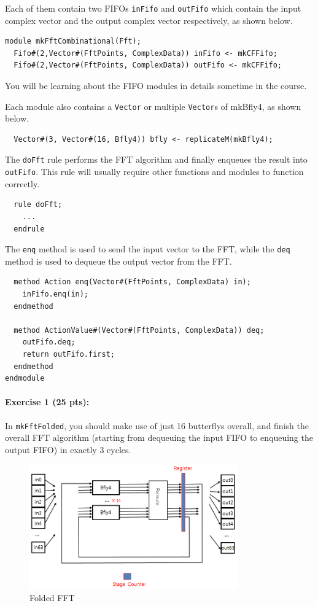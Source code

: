 \documentclass{article}
\begin{document}
Each of them contain two FIFOs \texttt{inFifo} and \texttt{outFifo} which contain the input
complex vector and the output complex vector respectively, as shown below.

\begin{verbatim} 
module mkFftCombinational(Fft);
  Fifo#(2,Vector#(FftPoints, ComplexData)) inFifo <- mkCFFifo;
  Fifo#(2,Vector#(FftPoints, ComplexData)) outFifo <- mkCFFifo;
\end{verbatim}

You will be learning about the FIFO modules in details sometime in the course.

Each module also contains a \texttt{Vector} or multiple \texttt{Vector}s of
mkBfly4, as shown below.

\begin{verbatim}
  Vector#(3, Vector#(16, Bfly4)) bfly <- replicateM(mkBfly4);
\end{verbatim}

The \texttt{doFft} rule performs the FFT algorithm and finally enqueues the
result into \texttt{outFifo}. This rule will usually require other functions
and modules to function correctly.

\begin{verbatim}
  rule doFft;
    ...
  endrule
\end{verbatim}

The \texttt{enq} method is used to send the input
vector to the FFT, while the \texttt{deq} method is used to dequeue the output
vector from the FFT.

\begin{verbatim}
  method Action enq(Vector#(FftPoints, ComplexData) in);
    inFifo.enq(in);
  endmethod

  method ActionValue#(Vector#(FftPoints, ComplexData)) deq;
    outFifo.deq;
    return outFifo.first;
  endmethod
endmodule 
\end{verbatim}

\noindent \paragraph{\bf Exercise 1 (25 pts):} 
In \texttt{mkFftFolded}, you should make use of just 16 butterflys overall, and
finish the overall FFT algorithm (starting from dequeuing the input FIFO to
enqueuing the output FIFO) in exactly 3 cycles.

\begin{figure}[!h]
\centering
\includegraphics[width=0.8\textwidth]{figs/fold.png}
\caption{Folded FFT}
\label{fold}
\end{figure}
\end{document}
